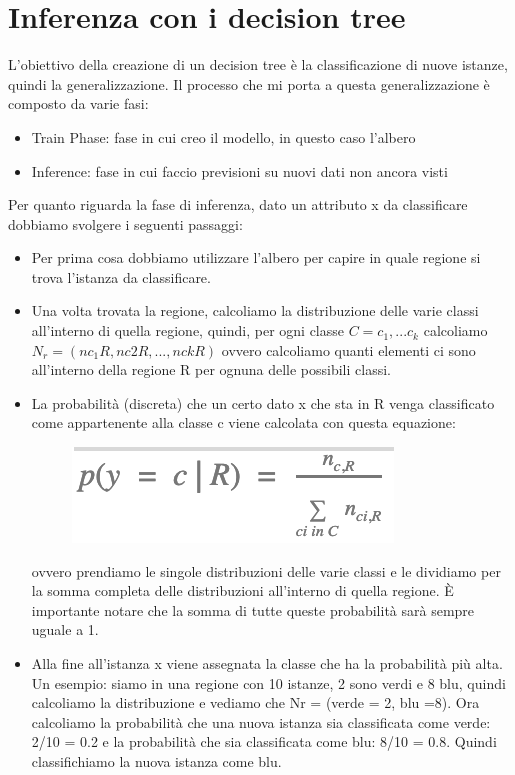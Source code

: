 \documentclass[14pt]{extreport}
\begin{document}
\section{Inferenza con i decision tree}

L’obiettivo della creazione di un decision tree è la classificazione di nuove istanze, quindi la generalizzazione. Il processo che mi porta a questa
generalizzazione è composto da varie fasi:
\begin{itemize}
	\item Train Phase: fase in cui creo il modello, in questo caso l’albero
	\item Inference: fase in cui faccio previsioni su nuovi dati non ancora visti
\end{itemize}

Per quanto riguarda la fase di inferenza, dato un attributo x da classificare dobbiamo svolgere i seguenti passaggi:
\begin{itemize}
	\item Per prima cosa dobbiamo utilizzare l’albero per capire in quale regione si trova l’istanza da classificare.
	\item Una volta trovata la regione, calcoliamo la distribuzione delle varie classi all’interno di quella regione, quindi, per ogni classe $C =
	      c_1,...c_k$  calcoliamo $N_r = (nc_1R, nc2R,..., nckR)$ ovvero calcoliamo quanti elementi ci sono all’interno della regione R per ognuna
	      delle possibili classi.

	\item La probabilità (discreta) che un certo dato x che sta in R venga classificato come appartenente alla classe c viene calcolata con questa
	equazione:

	      \begin{figure}[H]
		      \centering
		      \includegraphics[width=0.7\linewidth]{480.jpeg}
	      \end{figure}
	      ovvero prendiamo le singole distribuzioni delle varie classi e le dividiamo per la somma completa delle distribuzioni all’interno di quella
	      regione. È importante notare che la somma di tutte queste probabilità sarà sempre uguale a 1.

	\item Alla fine all’istanza x viene assegnata la classe che ha la probabilità più alta. Un esempio: siamo in una regione con 10 istanze, 2 sono
	      verdi e 8 blu, quindi calcoliamo la distribuzione e vediamo che Nr = (verde = 2, blu =8). Ora calcoliamo la probabilità che una nuova
	      istanza sia classificata come verde: 2/10 = 0.2 e la probabilità che sia classificata come blu: 8/10 = 0.8. Quindi classifichiamo la nuova
	      istanza come blu.

\end{itemize}
\end{document}
